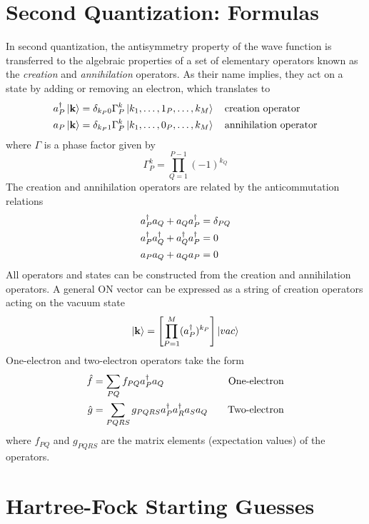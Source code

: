 \appendix

\chapter{Second Quantization: Formulas \label{app:SECQUA}}

In second quantization, the antisymmetry property of the wave function is transferred to the algebraic properties of a set of elementary operators known as the \emph{creation} and \emph{annihilation} operators. As their name implies, they act on a state by adding or removing an electron, which translates to 
\begin{align}
a^{\dagger}_P \ket{\smash{\mathbf{k}}} &= \delta_{k_P0} \Gamma^k_P \ket{\smash{k_1, \ldots, 1_P, \ldots, k_M}} \quad \textrm{creation operator} \\
a_P \ket{\smash{\mathbf{k}}} &= \delta_{k_P1} \Gamma^k_P \ket{\smash{k_1, \ldots, 0_P, \ldots, k_M}} \quad \textrm{annihilation operator}
\end{align}
\noindent where $\Gamma$ is a phase factor given by
\begin{equation}
\Gamma^k_P = \prod_{Q=1}^{P-1} (-1)^{k_Q}
\end{equation}
\noindent The creation and annihilation operators are related by the anticommutation relations
\begin{align}
a^{\dagger}_P a_Q + a_Q a^{\dagger}_P &= \delta_{PQ} \\
a^{\dagger}_P a^{\dagger}_Q + a^{\dagger}_Q a^{\dagger}_P &= 0 \\
a_P a_Q + a_Q a_P &= 0
\end{align}
\noindent All operators and states can be constructed from the creation and annihilation operators. A general ON vector can be expressed as a string of creation operators acting on the vacuum state
\begin{equation}
\ket{\mathbf{k}} = \left[ \prod_{P=1}^M (a^{\dagger}_P)^{k_P} \right] \ket{vac}
\end{equation}
\noindent One-electron and two-electron operators take the form
\begin{alignat}{2}
\hat{f} &= \sum_{PQ} f_{PQ} a^{\dagger}_P a_Q \quad & \text{One-electron} \\
\hat{g} &= \sum_{PQRS} g_{PQRS} a^{\dagger}_P a^{\dagger}_R a_S a_Q \quad & \text{Two-electron}
\end{alignat}
\noindent where $f_{PQ}$ and $g_{PQRS}$ are the matrix elements (expectation values) of the operators.

\chapter{Hartree-Fock Starting Guesses \label{sec:SCFGUESS}}

